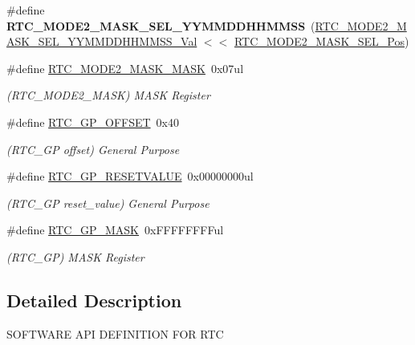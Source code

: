 \begin{DoxyCompactItemize}
\item 
\hypertarget{group___s_a_m_l21___r_t_c_gac6273b0c5ed0b1602e7a1db9f9028916}{}\#define {\bfseries R\+T\+C\+\_\+\+M\+O\+D\+E2\+\_\+\+M\+A\+S\+K\+\_\+\+S\+E\+L\+\_\+\+Y\+Y\+M\+M\+D\+D\+H\+H\+M\+M\+S\+S}~(\hyperlink{group___s_a_m_l21___r_t_c_ga68bd000f6eaf45dc8fedd848b9ff2a2b}{R\+T\+C\+\_\+\+M\+O\+D\+E2\+\_\+\+M\+A\+S\+K\+\_\+\+S\+E\+L\+\_\+\+Y\+Y\+M\+M\+D\+D\+H\+H\+M\+M\+S\+S\+\_\+\+Val} $<$$<$ \hyperlink{group___s_a_m_l21___r_t_c_ga34aaed36d41b5e7dad831c960d609d15}{R\+T\+C\+\_\+\+M\+O\+D\+E2\+\_\+\+M\+A\+S\+K\+\_\+\+S\+E\+L\+\_\+\+Pos})\label{group___s_a_m_l21___r_t_c_gac6273b0c5ed0b1602e7a1db9f9028916}

\item 
\hypertarget{group___s_a_m_l21___r_t_c_gabf37e9e0e2102260363ef86674f7265b}{}\#define \hyperlink{group___s_a_m_l21___r_t_c_gabf37e9e0e2102260363ef86674f7265b}{R\+T\+C\+\_\+\+M\+O\+D\+E2\+\_\+\+M\+A\+S\+K\+\_\+\+M\+A\+S\+K}~0x07ul\label{group___s_a_m_l21___r_t_c_gabf37e9e0e2102260363ef86674f7265b}

\begin{DoxyCompactList}\small\item\em (R\+T\+C\+\_\+\+M\+O\+D\+E2\+\_\+\+M\+A\+S\+K) M\+A\+S\+K Register \end{DoxyCompactList}\item 
\hypertarget{group___s_a_m_l21___r_t_c_ga0ae65357a5286cfc7a5e590e867aeedf}{}\#define \hyperlink{group___s_a_m_l21___r_t_c_ga0ae65357a5286cfc7a5e590e867aeedf}{R\+T\+C\+\_\+\+G\+P\+\_\+\+O\+F\+F\+S\+E\+T}~0x40\label{group___s_a_m_l21___r_t_c_ga0ae65357a5286cfc7a5e590e867aeedf}

\begin{DoxyCompactList}\small\item\em (R\+T\+C\+\_\+\+G\+P offset) General Purpose \end{DoxyCompactList}\item 
\hypertarget{group___s_a_m_l21___r_t_c_gacde03af69b3f7191c9bb6cb7db16b42c}{}\#define \hyperlink{group___s_a_m_l21___r_t_c_gacde03af69b3f7191c9bb6cb7db16b42c}{R\+T\+C\+\_\+\+G\+P\+\_\+\+R\+E\+S\+E\+T\+V\+A\+L\+U\+E}~0x00000000ul\label{group___s_a_m_l21___r_t_c_gacde03af69b3f7191c9bb6cb7db16b42c}

\begin{DoxyCompactList}\small\item\em (R\+T\+C\+\_\+\+G\+P reset\+\_\+value) General Purpose \end{DoxyCompactList}\item 
\hypertarget{group___s_a_m_l21___r_t_c_ga7e618e9682bbd32957ca838d165a0f9f}{}\#define \hyperlink{group___s_a_m_l21___r_t_c_ga7e618e9682bbd32957ca838d165a0f9f}{R\+T\+C\+\_\+\+G\+P\+\_\+\+M\+A\+S\+K}~0x\+F\+F\+F\+F\+F\+F\+F\+Ful\label{group___s_a_m_l21___r_t_c_ga7e618e9682bbd32957ca838d165a0f9f}

\begin{DoxyCompactList}\small\item\em (R\+T\+C\+\_\+\+G\+P) M\+A\+S\+K Register \end{DoxyCompactList}\end{DoxyCompactItemize}


\subsection{Detailed Description}
S\+O\+F\+T\+W\+A\+R\+E A\+P\+I D\+E\+F\+I\+N\+I\+T\+I\+O\+N F\+O\+R R\+T\+C 